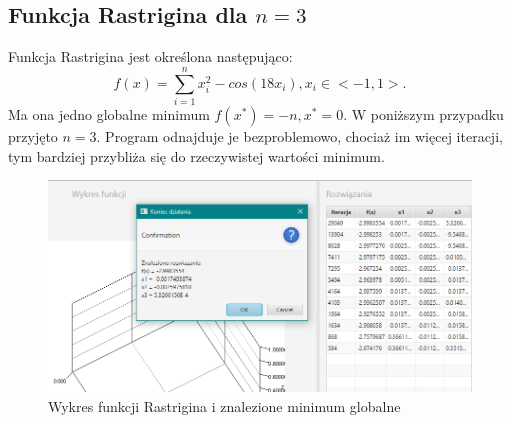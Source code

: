 \documentclass[10pt, a4paper]{article}
\begin{document}
\pagebreak 

\subsection{Funkcja Rastrigina dla $n = 3$ }
\label{subsec:rastrigin}
Funkcja Rastrigina jest określona następująco: $$f(x) = \sum_{i=1}^{n} x_{i}^2-cos(18x_{i}), x_{i} \in <-1,1>.$$ Ma ona jedno globalne minimum $f(x^*) = -n, x^* = 0.$ W poniższym przypadku przyjęto $n=3$. Program odnajduje je bezproblemowo, chociaż im więcej iteracji, tym bardziej przybliża się do rzeczywistej wartości minimum.
\begin{figure}[htbp] 
	\begin{minipage}[b]{1\textwidth}
		\centering
		\includegraphics[width=\linewidth]{images/Rastrigine.PNG} 
	\end{minipage}
	\label{fig:23}
	\caption{Wykres funkcji Rastrigina i znalezione minimum globalne}
\end{figure}
\end{document}

